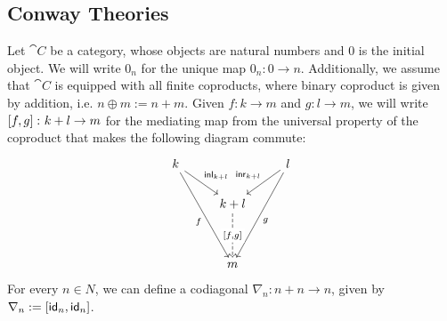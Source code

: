 \subsection{Conway Theories}\label{c3:subsec:conway}
Let $\cat{C}$ be a category, whose objects are natural numbers and $0$ is the initial object. We will write $0_n$ for the unique map $0_n \colon 0 \to n$. Additionally, we assume that $\cat{C}$ is equipped with all finite coproducts, where binary coproduct is given by addition, i.e. $n \oplus m := n + m$. Given $f \colon k \to m$ and $g \colon l \to m$, we will write $\left[ f,g \right] \colon k +l \to m$ for the mediating map from the universal property of the coproduct that makes the following diagram commute:
\begin{equation}\label{eqn:mediating}
\begin{tikzcd}
	k && l \\
	& {k+l} \\
	\\
	& m
	\arrow["\inl_{k + l}", from=1-1, to=2-2]
	\arrow["f"', from=1-1, to=4-2]
	\arrow["\inr_{k + l}"', from=1-3, to=2-2]
	\arrow["g", from=1-3, to=4-2]
	\arrow["{\lc f , g \rc}"{description}, dashed, from=2-2, to=4-2]
\end{tikzcd}
\end{equation}
For every $n \in N$, we can define a codiagonal $\nabla_{n} \colon n + n \to n$, given by $\nabla_n := \left[\mathsf{id}_n,\mathsf{id}_n\right]$.

